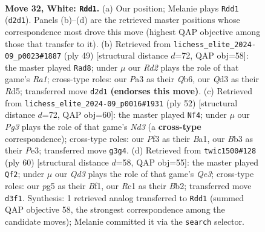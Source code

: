 \documentclass[11pt]{article}
\begin{document}
\clearpage

\begin{figure}[p]\centering
\begin{subfigure}{0.46\textwidth}\centering
\resizebox{\linewidth}{!}{%
\newchessgame
\chessboard[
  setfen={1rb5/pp1q2k1/n5p1/2pP2pp/8/PB1Q1PP1/1P1R1K1P/2R5 w - - 3 32},
  showmover=false,
  pgfstyle=straightmove, color=movearrow, markmove={d2-d1}
]}
\caption{}
\end{subfigure}\hfill
\begin{subfigure}{0.46\textwidth}\centering
\resizebox{\linewidth}{!}{%
\newchessgame
\chessboard[
  setfen={r5k1/1pp2pb1/1q4p1/3rp1Q1/p3N1P1/P1P5/1P3PKP/3RR3 b - - 1 25},
  showmover=false,
  pgfstyle=straightmove, color=movearrow, markmove={a8-d8}
]}
\caption{}
\end{subfigure}
\\[4pt]
\begin{subfigure}{0.46\textwidth}\centering
\resizebox{\linewidth}{!}{%
\newchessgame
\chessboard[
  setfen={6k1/6pp/p1rqpp2/bp6/n2P2QP/P2NP3/5PP1/B4RK1 w - - 4 27},
  showmover=false,
  pgfstyle=straightmove, color=movearrow, markmove={d3-f4}
]}
\caption{}
\end{subfigure}\hfill
\begin{subfigure}{0.46\textwidth}\centering
\resizebox{\linewidth}{!}{%
\newchessgame
\chessboard[
  setfen={3r2k1/5bpp/1p1qnp2/p2p4/7P/1P2QP2/PB1R2P1/5BK1 w - - 9 31},
  showmover=false,
  pgfstyle=straightmove, color=movearrow, markmove={e3-f2}
]}
\caption{}
\end{subfigure}
\caption{\textbf{Move 32, White: \texttt{Rdd1}.} (a) Our position; Melanie plays \texttt{Rdd1} (\texttt{d2d1}). Panels (b)--(d) are the retrieved master positions whose correspondence most drove this move (highest QAP objective among those that transfer to it). (b) Retrieved from \texttt{lichess\_elite\_2024-09\_p0023\#1887} (ply 49) [structural distance $d$=72, QAP obj=58]: the master played \texttt{Rad8}; under $\mu$ our \emph{Rd2} plays the role of that game's \emph{Ra1}; cross-type roles: our \emph{P}a3 as their \emph{Q}b6, our \emph{Q}d3 as their \emph{R}d5; transferred move \texttt{d2d1} \textbf{(endorses this move)}. (c) Retrieved from \texttt{lichess\_elite\_2024-09\_p0016\#1931} (ply 52) [structural distance $d$=72, QAP obj=60]: the master played \texttt{Nf4}; under $\mu$ our \emph{Pg3} plays the role of that game's \emph{Nd3} (a \textbf{cross-type} correspondence); cross-type roles: our \emph{P}f3 as their \emph{B}a1, our \emph{B}b3 as their \emph{P}e3; transferred move \texttt{g3g4}. (d) Retrieved from \texttt{twic1500\#128} (ply 60) [structural distance $d$=58, QAP obj=55]: the master played \texttt{Qf2}; under $\mu$ our \emph{Qd3} plays the role of that game's \emph{Qe3}; cross-type roles: our \emph{p}g5 as their \emph{B}f1, our \emph{R}c1 as their \emph{B}b2; transferred move \texttt{d3f1}. Synthesis: 1 retrieved analog transferred to \texttt{Rdd1} (summed QAP objective 58, the strongest correspondence among the candidate moves); Melanie committed it via the \texttt{search} selector.}
\label{fig:thought-m62}
\end{figure}
\end{document}
